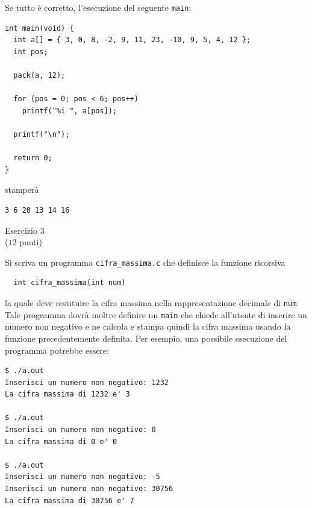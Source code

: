 \documentclass[italian,12pt]{article}
\begin{document}
\newpage
Se tutto \`e corretto, l'esecuzione del seguente \texttt{main}:
{\small
\begin{verbatim}
int main(void) {
  int a[] = { 3, 0, 8, -2, 9, 11, 23, -10, 9, 5, 4, 12 };
  int pos;

  pack(a, 12);

  for (pos = 0; pos < 6; pos++)
    printf("%i ", a[pos]);

  printf("\n");

  return 0;
}
\end{verbatim}
}

\noindent
stamper\`a
%
{\small
\begin{verbatim}
3 6 20 13 14 16
\end{verbatim}
}
%
\begin{center}{\Large Esercizio 3}\\
($12$ punti)\end{center}
%
Si scriva un programma \texttt{cifra\_massima.c} che definisce la funzione ricorsiva
\begin{verbatim}
  int cifra_massima(int num)
\end{verbatim}
%
la quale deve restituire la cifra massima nella rappresentazione decimale di \texttt{num}.
Tale programma dovr\`a inoltre definire un \texttt{main} che chiede all'utente di inserire un numero
non negativo e ne calcola e stampa quindi la cifra massima usando la funzione precedentemente definita.
Per esempio, una possibile esecuzione del programma potrebbe essere:
%
{\small
\begin{verbatim}
$ ./a.out
Inserisci un numero non negativo: 1232 
La cifra massima di 1232 e' 3

$ ./a.out
Inserisci un numero non negativo: 0
La cifra massima di 0 e' 0

$ ./a.out
Inserisci un numero non negativo: -5
Inserisci un numero non negativo: 30756
La cifra massima di 30756 e' 7
\end{verbatim}
}
\end{document}
